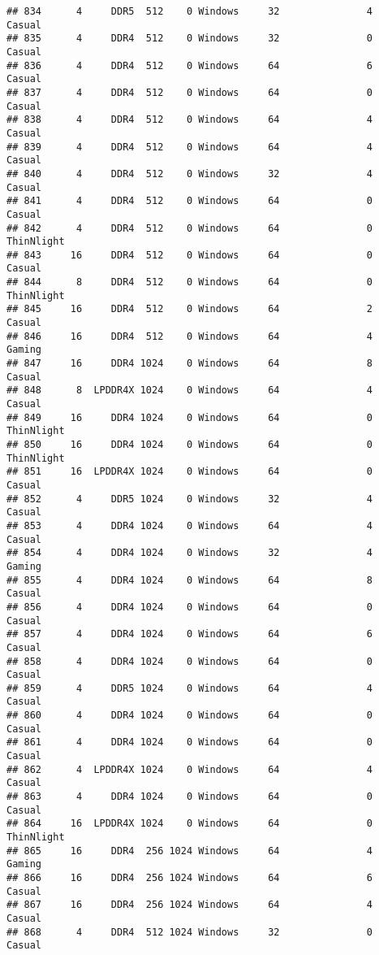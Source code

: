 \documentclass[
]{article}
\begin{document}
\begin{verbatim}
## 834      4     DDR5  512    0 Windows     32               4     Casual
## 835      4     DDR4  512    0 Windows     32               0     Casual
## 836      4     DDR4  512    0 Windows     64               6     Casual
## 837      4     DDR4  512    0 Windows     64               0     Casual
## 838      4     DDR4  512    0 Windows     64               4     Casual
## 839      4     DDR4  512    0 Windows     64               4     Casual
## 840      4     DDR4  512    0 Windows     32               4     Casual
## 841      4     DDR4  512    0 Windows     64               0     Casual
## 842      4     DDR4  512    0 Windows     64               0 ThinNlight
## 843     16     DDR4  512    0 Windows     64               0     Casual
## 844      8     DDR4  512    0 Windows     64               0 ThinNlight
## 845     16     DDR4  512    0 Windows     64               2     Casual
## 846     16     DDR4  512    0 Windows     64               4     Gaming
## 847     16     DDR4 1024    0 Windows     64               8     Casual
## 848      8  LPDDR4X 1024    0 Windows     64               4     Casual
## 849     16     DDR4 1024    0 Windows     64               0 ThinNlight
## 850     16     DDR4 1024    0 Windows     64               0 ThinNlight
## 851     16  LPDDR4X 1024    0 Windows     64               0     Casual
## 852      4     DDR5 1024    0 Windows     32               4     Casual
## 853      4     DDR4 1024    0 Windows     64               4     Casual
## 854      4     DDR4 1024    0 Windows     32               4     Gaming
## 855      4     DDR4 1024    0 Windows     64               8     Casual
## 856      4     DDR4 1024    0 Windows     64               0     Casual
## 857      4     DDR4 1024    0 Windows     64               6     Casual
## 858      4     DDR4 1024    0 Windows     64               0     Casual
## 859      4     DDR5 1024    0 Windows     64               4     Casual
## 860      4     DDR4 1024    0 Windows     64               0     Casual
## 861      4     DDR4 1024    0 Windows     64               0     Casual
## 862      4  LPDDR4X 1024    0 Windows     64               4     Casual
## 863      4     DDR4 1024    0 Windows     64               0     Casual
## 864     16  LPDDR4X 1024    0 Windows     64               0 ThinNlight
## 865     16     DDR4  256 1024 Windows     64               4     Gaming
## 866     16     DDR4  256 1024 Windows     64               6     Casual
## 867     16     DDR4  256 1024 Windows     64               4     Casual
## 868      4     DDR4  512 1024 Windows     32               0     Casual

\end{verbatim}
\end{document}
